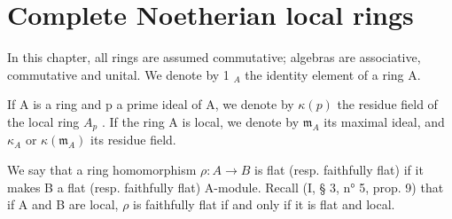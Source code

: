 \chapter{Complete Noetherian local rings}

In this chapter, all rings are assumed commutative; algebras are associative, commutative and unital. We denote by 1 \(_{A}\) the identity element of a ring A.

If A is a ring and p a prime ideal of A, we denote by \(\kappa(p)\) the residue field of the local ring \(A_p\) . If the ring A is local, we denote by \(\mathfrak{m}_A\) its maximal ideal, and \(\kappa_A\) or \(\kappa(\mathfrak{m}_A)\) its residue field.

We say that a ring homomorphism \(\rho: A \to B\) is flat (resp. faithfully flat) if it makes B a flat (resp. faithfully flat) A-module. Recall (I, § 3, n° 5, prop. 9) that if A and B are local, \(\rho\) is faithfully flat if and only if it is flat and local.

